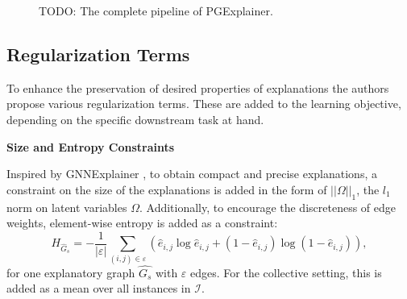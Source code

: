 \begin{figure}
\caption[Pipeline of PGExplainer]{TODO: The complete pipeline of PGExplainer.}
\label{fig:PGExplainer_pipeline}
\end{figure}

\subsection{Regularization Terms}
\label{sec:Regularization_Terms}
To enhance the preservation of desired properties of explanations the authors propose various regularization terms. These are added to the learning objective, depending on the specific downstream task at hand.\bigskip

\textbf{Size and Entropy Constraints}\par
Inspired by GNNExplainer \cite{ying2019gnnexplainer}, to obtain compact and precise explanations, a constraint on the size of the explanations is added in the form of $||\Omega||_1$, the $l_1$ norm on latent variables $\Omega$. Additionally, to encourage the discreteness of edge weights, element-wise entropy is added as a constraint:
\begin{equation}
    H_{\hat{G}_s} = -\frac{1}{|\varepsilon|}\sum_{(i,j)\in \varepsilon} (\hat{e}_{i,j}\log \hat{e}_{i,j} + (1-\hat{e}_{i,j})\log(1-\hat{e}_{i,j})),
\end{equation}
for one explanatory graph $\hat{G_s}$ with $\varepsilon$ edges. For the collective setting, this is added as a mean over all instances in $\mathcal{I}$. \bigskip

